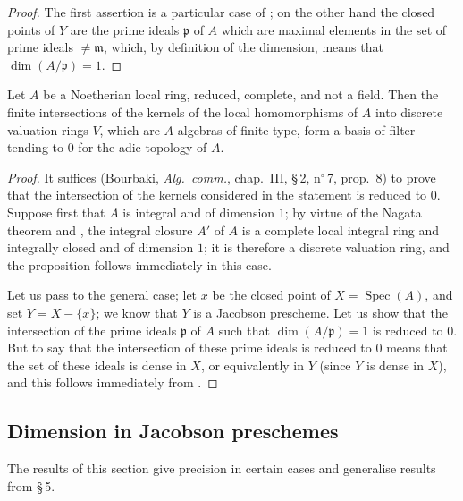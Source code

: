 \begin{proof}
The first assertion is a particular case of ; on the other hand the closed points of $Y$ are the prime ideals $\mathfrak{p}$ of $A$ which are maximal elements in the set of prime ideals $\neq\mathfrak{m}$, which, by definition of the dimension, means that $\dim(A/\mathfrak{p})=1$.
\end{proof}

\begin{proposition}[10.5.10]
\label{IV.10.5.10}
Let $A$ be a Noetherian local ring, reduced, complete, and not a field.
Then the finite intersections of the kernels of the local homomorphisms of $A$ into discrete valuation rings $V$, which are $A$-algebras of finite type, form a basis of filter tending to $0$ for the adic topology of $A$.
\end{proposition}

\begin{proof}
It suffices (Bourbaki, \emph{Alg.\ comm.}, chap.~III, \S\,2, n$^\circ$\,7, prop.~8) to prove that the intersection of the kernels considered in the statement is reduced to $0$.
Suppose first that $A$ is integral and of dimension $1$; by virtue of the Nagata theorem  and , the integral closure $A'$ of $A$ is a complete local integral ring and
integrally closed and of dimension $1$; it is therefore a discrete valuation ring, and the proposition follows immediately in this case.

Let us pass to the general case; let $x$ be the closed point of $X=\operatorname{Spec}(A)$, and set $Y=X-\{x\}$; we know  that $Y$ is a Jacobson prescheme.
Let us show that the intersection of the prime ideals $\mathfrak{p}$ of $A$ such that $\dim(A/\mathfrak{p})=1$ is reduced to $0$.
But to say that the intersection of these prime ideals is reduced to $0$ means that the set of these ideals is dense in $X$, or equivalently in $Y$ (since $Y$ is dense in $X$), and this follows immediately from .
\end{proof}

\subsection{Dimension in Jacobson preschemes}
\label{subsection:IV.10.6}

The results of this section give precision in certain cases and generalise results from \S\,5.

